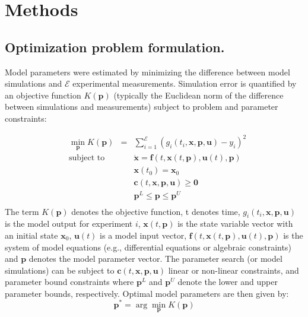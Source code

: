 \documentclass{bmcart}
\begin{document}
\section*{Methods}

\subsection*{Optimization problem formulation.}
Model parameters were estimated by minimizing the difference between model simulations and $\mathcal{E}$ experimental measurements.
Simulation error is quantified by an objective function $K\left(\mathbf{p}\right)$
(typically the Euclidean norm of the difference between simulations and measurements) subject to problem and parameter constraints:

\begin{equation}\label{eq:static_opt}
\begin{aligned}
& \min_{\mathbf{p}} K(\mathbf{p}) & =& \sum_{i=1}^\mathcal{E} \left(g_i(t_i,\mathbf{x,p,u})-y_i\right)^2 \\
& \text{subject to}
&&\dot{\mathbf{x}}=\mathbf{f}(t,\mathbf{x}(t,\mathbf{p}),\mathbf{u}(t),\mathbf{p})\\
&&&\mathbf{x}(t_0) = \mathbf{x}_0\\
&&&\mathbf{c}(t,\mathbf{x,p,u}) \geqslant \mathbf{0} \\
&&& \mathbf{p}^L \leqslant \mathbf{p} \leqslant \mathbf{p}^U\\
\end{aligned}
\end{equation}
The term $K(\mathbf{p})$ denotes the objective function, t denotes time, $g_i(t_i,\mathbf{x,p,u})$ is the model output for experiment $i$,
$\mathbf{x}\left(t,\mathbf{p}\right)$ is the state variable vector with an initial state $\mathbf{x}_{0}$, $\mathbf{u}(t)$ is a model input vector,
$\mathbf{f}(t,\mathbf{x}(t,\mathbf{p}),\mathbf{u}(t),\mathbf{p})$ is the system of model equations (e.g., differential equations or algebraic constraints)
and $\mathbf{p}$ denotes the model parameter vector.
The parameter search (or model simulations) can be subject to $\mathbf{c}(t,\mathbf{x,p,u})$ linear or non-linear constraints, and parameter bound constraints where
$\mathbf{p}^{L}$ and $\mathbf{p}^{U}$ denote the lower and upper parameter bounds, respectively.
Optimal model parameters are then given by:
\begin{equation}\label{eq:static_opt_2}
\mathbf{p^{*}}= \arg\min_{\mathbf{p}} K\left(\mathbf{\mathbf{p}}\right)
\end{equation}
\end{document}
